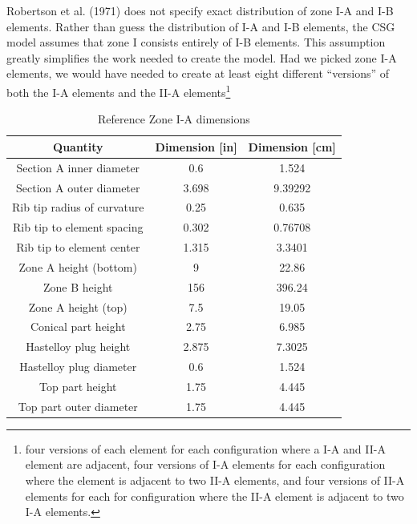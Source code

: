 Robertson et al. (1971) does not specify exact distribution of zone I-A and I-B
elements. Rather than guess the distribution of I-A and I-B elements, the CSG
model assumes that zone I consists entirely of I-B elements. This assumption
greatly simplifies the work needed to create the model. Had we picked zone I-A
elements, we would have needed to create at least eight different ``versions''
of both the I-A elements and the II-A elements\footnote{four versions of each
element for each configuration where a I-A and II-A element are adjacent,
four versions of I-A elements for each configuration where the element is
adjacent to two II-A elements, and four versions of II-A elements for each for
configuration where the II-A element is adjacent to two I-A elements.}

\begin{table}[htpb]
    \centering
    \caption{Reference Zone I-A dimensions}
    \label{tab:zone-ia-ref-specs}
    \begin{tabulary}{\linewidth}{|C|C|C|}
    \hline
    Quantity & Dimension [in] & Dimension [\unit{\centi\metre}]\\
    \hline
    Section A inner diameter & 0.6 & 1.524 \\
    \hline
    Section A outer diameter & 3.698 & 9.39292 \\
    \hline
    Rib tip radius of curvature & 0.25 & 0.635 \\
    \hline
    Rib tip to element spacing & 0.302 & 0.76708 \\
    \hline
    Rib tip to element center & 1.315 & 3.3401 \\
    \hline
    Zone A height (bottom) & 9 & 22.86\\
    \hline
    Zone B height & 156 & 396.24 \\
    \hline
    Zone A height (top) & 7.5 & 19.05 \\
    \hline
    Conical part height & 2.75 & 6.985 \\
    \hline
    Hastelloy plug height & 2.875 & 7.3025 \\
    \hline
    Hastelloy plug diameter & 0.6 & 1.524 \\
    \hline
    Top part height & 1.75 & 4.445 \\
    \hline
    Top part outer diameter & 1.75 & 4.445 \\
    \hline
    \end{tabulary}
\end{table}


